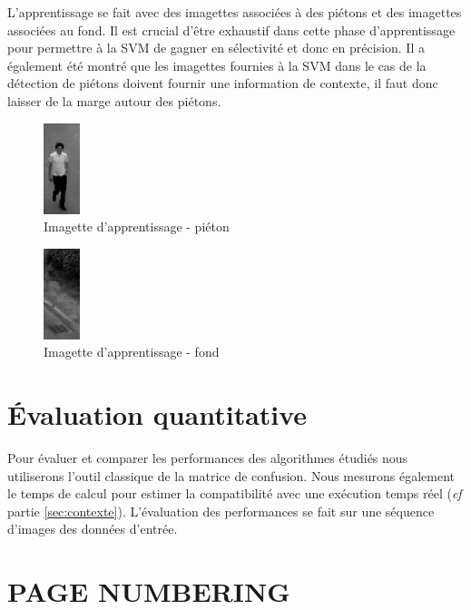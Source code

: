 \documentclass{article}
\begin{document}
	L'apprentissage se fait avec des imagettes associées à des piétons et des imagettes associées au fond. Il est crucial d'être exhaustif dans cette phase d'apprentissage pour permettre à la SVM de gagner en sélectivité et donc en précision. Il a également été montré \cite{HOG} que les imagettes fournies à la SVM dans le cas de la détection de piétons doivent fournir une information de contexte, il faut donc laisser de la marge autour des piétons.
	
	\begin{figure}[h]
		\begin{center}			
			\includegraphics[scale=1]{Img/pieton_03}
		\end{center}
		\caption{Imagette d'apprentissage - piéton}
	\end{figure}
	
	
	\begin{figure}[h]
		\begin{center}			
			\includegraphics[scale=1]{Img/fond_01}
		\end{center}
		\caption{Imagette d'apprentissage - fond}
	\end{figure}

\section{\'{E}valuation quantitative}
\label{sec:evalquant}

	Pour évaluer et comparer les performances des algorithmes étudiés nous utiliserons l'outil classique de la matrice de confusion. Nous mesurons également le temps de calcul pour estimer la compatibilité avec une exécution temps réel (\emph{cf} partie \ref{sec:contexte}).
	L'évaluation des performances se fait sur une séquence d'images des données d'entrée.  

\section{PAGE NUMBERING}
\label{sec:page}
\end{document}

